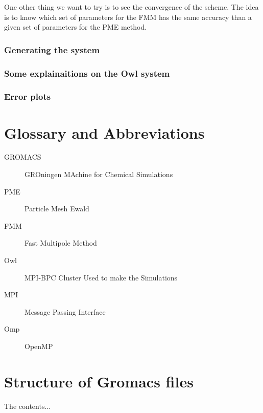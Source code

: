 \documentclass[11pt,twoside,a4paper]{report}
\begin{document}
One other thing we want to try is to see the convergence of the scheme. The idea is to know which set of parameters for the FMM has the same accuracy than a given set of parameters for the PME method. 



\subsection{Generating the system}
\subsection{Some explainaitions on the Owl system}
\subsection{Error plots}




\nocite{*}

 

\begin{appendices}
\chapter{Glossary and Abbreviations}

\begin{description}

\item[GROMACS] GROningen MAchine for Chemical Simulations
\item[PME] Particle Mesh Ewald
\item[FMM] Fast Multipole Method
\item[Owl] MPI-BPC Cluster Used to make the Simulations

\item[MPI] Message Passing Interface
\item[Omp] OpenMP

\end{description}


\chapter{Structure of Gromacs files}
The contents...
\end{appendices}
\end{document}
